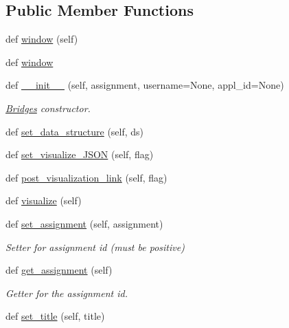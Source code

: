 \subsection*{Public Member Functions}
\begin{DoxyCompactItemize}
\item 
def \hyperlink{classbridges_1_1bridges_1_1_bridges_a1340374df9e4aa1490d9cd9be2b0e918}{window} (self)
\item 
def \hyperlink{classbridges_1_1bridges_1_1_bridges_ab434ee3f7b3b8c9eb4f8a07d97789a82}{window}
\item 
def \hyperlink{classbridges_1_1bridges_1_1_bridges_af40aff29a2bc4efbaeb4186275fe7480}{\+\_\+\+\_\+init\+\_\+\+\_\+} (self, assignment, username=None, appl\+\_\+id=None)
\begin{DoxyCompactList}\small\item\em \hyperlink{classbridges_1_1bridges_1_1_bridges}{Bridges} constructor. \end{DoxyCompactList}\item 
def \hyperlink{classbridges_1_1bridges_1_1_bridges_a868f02fa66c87c1a1fc7bd6fbc799291}{set\+\_\+data\+\_\+structure} (self, ds)
\item 
def \hyperlink{classbridges_1_1bridges_1_1_bridges_ab50d018b5178ca33de24157b7b6de285}{set\+\_\+visualize\+\_\+\+J\+S\+ON} (self, flag)
\item 
def \hyperlink{classbridges_1_1bridges_1_1_bridges_affea08c46fe175e8ed319b14db319fb1}{post\+\_\+visualization\+\_\+link} (self, flag)
\item 
def \hyperlink{classbridges_1_1bridges_1_1_bridges_a3c1321f8be7b249639a47eba10b67c70}{visualize} (self)
\item 
def \hyperlink{classbridges_1_1bridges_1_1_bridges_add46441bec1c93095c48adc724b90e12}{set\+\_\+assignment} (self, assignment)
\begin{DoxyCompactList}\small\item\em Setter for assignment id (must be positive) \end{DoxyCompactList}\item 
def \hyperlink{classbridges_1_1bridges_1_1_bridges_a1e7bd56f6a3beb03c91fc989cf3f7eb8}{get\+\_\+assignment} (self)
\begin{DoxyCompactList}\small\item\em Getter for the assignment id. \end{DoxyCompactList}\item 
def \hyperlink{classbridges_1_1bridges_1_1_bridges_a3b0c629c1ae0beaac05fa9d90846c423}{set\+\_\+title} (self, title)

\end{DoxyCompactItemize}
